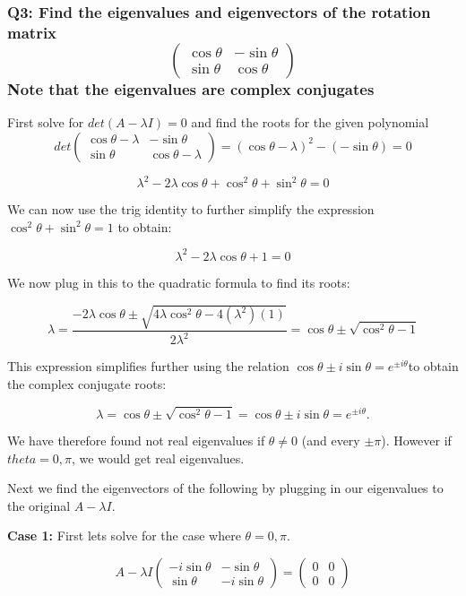 \documentclass[8pt]{article}
\begin{document}
{\subsubsection*{Q3: Find the eigenvalues and eigenvectors of the rotation matrix
$$
\begin{pmatrix}
\cos \theta & -\sin \theta \\
\sin \theta & \cos \theta
\end{pmatrix}
$$
Note that the eigenvalues are complex conjugates}

First solve for $det(A- \lambda I) = 0$ and find the roots for the given polynomial
$$
det \begin{pmatrix}
\cos \theta - \lambda & -\sin \theta \\
\sin \theta & \cos \theta - \lambda
\end{pmatrix} = (\cos \theta - \lambda)^{2} - (-\sin \theta) = 0 
$$

$$
\lambda ^{2}-2 \lambda \cos \theta + \cos ^{2} \theta + \sin ^{2} \theta = 0
$$

We can now use the trig identity to further simplify the expression $ \cos ^{2} \theta + \sin ^{2} \theta = 1$ to obtain: 

$$
\lambda ^{2}-2 \lambda \cos \theta + 1 = 0
$$

We now plug in this to the quadratic formula to find its roots:

$$
\lambda = \frac{-2 \lambda \cos \theta \pm \sqrt{4 \lambda \cos ^{2} \theta - 4(\lambda ^{2})(1)}}{2 \lambda ^{2}} = \cos \theta \pm \sqrt{\cos ^{2} \theta -1 } 
$$

This expression simplifies further using the relation $\cos \theta \pm i \sin \theta = e^{\pm i \theta}$to obtain the complex conjugate roots:

$$
\lambda = \cos \theta \pm \sqrt{\cos ^{2} \theta -1 } = \cos \theta \pm i \sin \theta = e^{\pm i \theta}.
$$

We have therefore found not real eigenvalues if $\theta \neq 0$ (and every $\pm \pi$). However if $theta = 0, \pi$, we would get real eigenvalues.

Next we find the eigenvectors of the following by plugging in our eigenvalues to the original $A- \lambda I$.

\textbf{Case 1:} First lets solve for the case where $\theta = 0, \pi$.

$$
A - \lambda I
\begin{pmatrix}
 -i \sin \theta & -\sin \theta \\
\sin \theta & -i \sin \theta 
\end{pmatrix} = 
\begin{pmatrix}
 0 & 0 \\
0 & 0 
\end{pmatrix} 
$$

}
\end{document}
